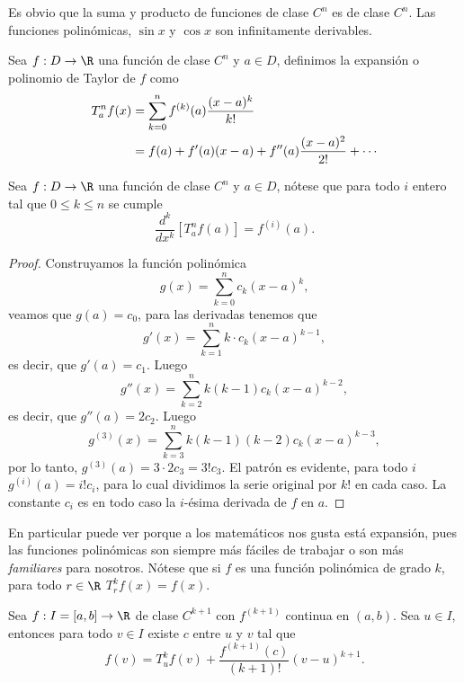 \documentclass[11pt,oneside,a4paper]{book}
\begin{document}
Es obvio que la suma y producto de funciones de clase $C^n$ es de clase $C^n$. Las funciones polinómicas, $\sin x$ y $\cos x$ son infinitamente derivables.
\begin{mydef}
Sea $f:D\rightarrow\R$ una función de clase $C^n$ y $a\in D$, definimos la expansión o polinomio de Taylor de $f$ como
\begin{align}
T^n_a f(x)&=\sum_{k=0}^n f^{(k)}(a)\frac{(x-a)^k}{k!}\notag\\
&=f(a)+f'(a)(x-a)+f''(a)\frac{(x-a)^2}{2!}+\cdots
\end{align}
\end{mydef}
\begin{thm}
Sea $f:D\rightarrow\R$ una función de clase $C^n$ y $a\in D$, nótese que para todo $i$ entero tal que $0\leq k\leq n$ se cumple
$$\frac{d^k}{dx^k}[T_a^n f(a)]=f^{(i)}(a).$$
\end{thm}
\begin{proof}
Construyamos la función polinómica
$$g(x)=\sum_{k=0}^n c_k(x-a)^k,$$
veamos que $g(a)=c_0$, para las derivadas tenemos que
$$g'(x)=\sum_{k=1}^n k\cdot c_k(x-a)^{k-1},$$
es decir, que $g'(a)=c_1$. Luego
$$g''(x)=\sum_{k=2}^n k(k-1)c_k(x-a)^{k-2},$$
es decir, que $g''(a)=2c_2$. Luego
$$g^{(3)}(x)=\sum_{k=3}^n k(k-1)(k-2)c_k(x-a)^{k-3},$$
por lo tanto, $g^{(3)}(a)=3\cdot 2c_3=3!c_3$. El patrón es evidente, para todo $i$ $g^{(i)}(a)=i!c_i$, para lo cual dividimos la serie original por $k!$ en cada caso. La constante $c_i$ es en todo caso la $i$-ésima derivada de $f$ en $a$.
\end{proof}
En particular puede ver porque a los matemáticos nos gusta está expansión, pues las funciones polinómicas son siempre más fáciles de trabajar o son más \textit{familiares} para nosotros. Nótese que si $f$ es una función polinómica de grado $k$, para todo $r\in\R$ $T_r^k f(x)=f(x)$.
\begin{thm}
Sea $f:I=[a,b]\rightarrow\R$ de clase $C^{k+1}$ con $f^{(k+1)}$ continua en $(a,b)$. Sea $u\in I$, entonces para todo $v\in I$ existe $c$ entre $u$ y $v$ tal que
$$f(v)=T^k_uf(v)+\frac{f^{(k+1)}(c)}{(k+1)!}(v-u)^{k+1}.$$
\end{thm}
\end{document}
